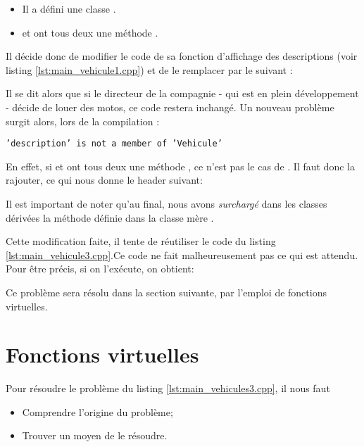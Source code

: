 \begin{itemize}
	\item Il a d\'efini une classe  .
	\item {} et  ont tous deux une m\'ethode .
\end{itemize}


Il d\'ecide donc de modifier le code de sa fonction d'affichage des descriptions (voir listing \ref{lst:main_vehicule1.cpp}) et de le remplacer par le suivant :


Il se dit alors que si le directeur de la compagnie - qui est en plein
d\'eveloppement - d\'ecide de louer des motos, ce code restera inchang\'e.  Un nouveau probl\`eme surgit alors, lors de la compilation :

\texttt{'description' is not a member of 'Vehicule'}

En effet, si  et  ont tous deux une m\'ethode , ce n'est pas le cas de . Il faut donc la rajouter, ce qui nous donne le header suivant:


Il est important de noter qu'au final, nous avons \emph{surcharg\'e} dans les classes
d\'eriv\'ees la m\'ethode  d\'efinie dans la classe
m\`ere .


Cette modification faite, il tente de r\'eutiliser le code du listing \ref{lst:main_vehicule3.cpp}.Ce code ne fait malheureusement  pas ce qui est attendu.  Pour \^etre pr\'ecis, si on l'ex\'ecute, on obtient:



Ce probl\`eme sera r\'esolu dans la section suivante, par l'emploi de fonctions virtuelles.


\section{Fonctions virtuelles}

Pour r\'esoudre le probl\`eme du listing \ref{lst:main_vehicules3.cpp},
il nous faut

\begin{itemize}
	\item Comprendre l'origine du probl\`eme;
	\item Trouver un moyen de le r\'esoudre.
\end{itemize}

